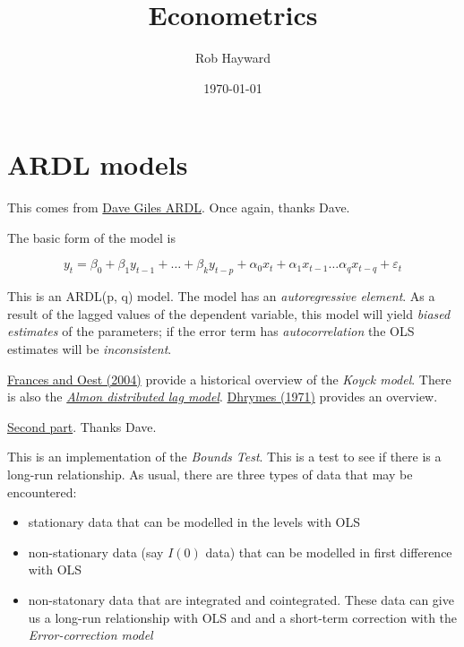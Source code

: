 \documentclass[12pt, a4paper, oneside]{article}\usepackage[]{graphicx}\usepackage[]{color}
\begin{document}
\title{Econometrics}
\author{Rob Hayward}
\date{\today}
\maketitle
\section{ARDL models}
This comes from \href{http://davegiles.blogspot.ca/2013/03/ardl-models-part-i.html}{Dave Giles ARDL}.  Once again, thanks Dave. 

The basic form of the model is

\begin{equation}\label{ARDL}
y_t = \beta_0 + \beta_1 y_{t-1} + \dots + \beta_k y_{t-p} +\alpha_0 x_t + \alpha_1 x_{t-1} \dots \alpha_q x_{t-q} + \varepsilon_t
\end{equation}

This is an ARDL(p, q) model.  The model has an \emph{autoregressive element}. As a result of the lagged values of the dependent variable, this model will yield \emph{biased estimates} of the parameters; if the error term has \emph{autocorrelation} the OLS estimates will be \emph{inconsistent}.  

\href{http://ideas.repec.org/p/dgr/eureir/1765001190.html}{Frances and Oest (2004)} provide a historical overview of the \emph{Koyck model}. There is also the \href{http://www.econometricsociety.org/abstract.asp?ref=0012-9682&vid=33&iid=1&aid=0012-9682%28196501%2933%3A1%26lt%3B178%3ATDLBCA%26gt%3B2%2E0%2ECO%3B2-0&s=-9999}{\emph{Almon distributed lag model}}.  \href{http://www.amazon.com/Distributed-Lags-Estimation-Formulation-Textbooks/dp/0444860134/ref=sr_1_sc_2?s=books&ie=UTF8&qid=1362589275&sr=1-2-spell&keywords=dhrymas+distributed+lag}{Dhrymes (1971)} provides an overview. 

\href{http://davegiles.blogspot.ca/2013/06/ardl-models-part-ii-bounds-tests.html}{Second part}.  Thanks Dave. 

This is an implementation of the \emph{Bounds Test}.  This is a test to see if there is a long-run relationship. As usual, there are three types of data that may be encountered: 
\begin{itemize}
\item stationary data that can be modelled in the levels with OLS
\item non-stationary data (say $I(0)$ data) that can be modelled in first difference with OLS
\item non-statonary data that are integrated and cointegrated. These data can give us a long-run relationship with OLS and and a short-term correction with the \emph{Error-correction model}
\end{itemize}
\end{document}
